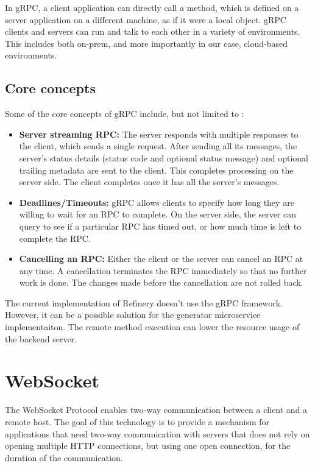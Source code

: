 	In gRPC, a client application can directly call a method, which is defined on a server application on a different machine, as if it were a local object. 
	gRPC clients and servers can run and talk to each other in a variety of environments. This includes both on-prem, and more importantly in our case,
	cloud-based environments.
	\cite{grpcspec}

	\subsection{Core concepts}
	Some of the core concepts of gRPC include, but not limited to \cite{grpcspec2}:
	\begin{itemize}
		\item \textbf{Server streaming RPC:} The server responds with multiple responses to the client, which sends a single request. 
		After sending all its messages, the server’s status details (status code and optional status message) and optional trailing metadata are sent to the client.
		This completes processing on the server side. The client completes once it has all the server’s messages.
		\item \textbf{Deadlines/Timeouts:} gRPC allows clients to specify how long they are willing to wait for an RPC to complete. On the server side, the server can query to see if a particular RPC has timed out, or how much time is left to complete the RPC.
		\item \textbf{Cancelling an RPC:} Either the client or the server can cancel an RPC at any time. A cancellation terminates the RPC immediately so that no further work is done. The changes made before the cancellation are not rolled back.
	\end{itemize}

	The current implementation of Refinery doesn't use the gRPC framework. However, it can be a possible solution for the generator microservice implementaiton. 
	The remote method execution can lower the resource usage of the backend server.

\section{WebSocket}
	The WebSocket Protocol \cite{websocket} enables two-way communication between a client
	and a remote host.
	The goal of
	this technology is to provide a mechanism for applications that need two-way communication with servers that does
	not rely on opening multiple HTTP connections, but using one open connection, for the duration of the communication.

